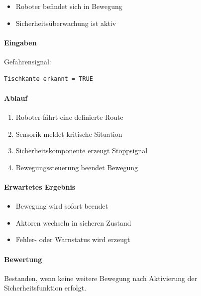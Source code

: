 \documentclass[
  a4paper,
  12pt,
  DIV=12,        %
  parskip=half,  %
  headings=small %
]{scrartcl}
\theoremstyle{definition}
\providecommand{\tightlist}{%
  \setlength{\itemsep}{0pt}\setlength{\parskip}{0pt}}
\theoremstyle{definition}
\begin{document}
\begin{itemize}
\tightlist
\item
  Roboter befindet sich in Bewegung
\item
  Sicherheitsüberwachung ist aktiv
\end{itemize}

\paragraph{Eingaben}\label{eingaben-12}

Gefahrensignal:

\begin{verbatim}
Tischkante erkannt = TRUE
\end{verbatim}

\paragraph{Ablauf}\label{ablauf-12}

\begin{enumerate}
\def\labelenumi{\arabic{enumi}.}
\tightlist
\item
  Roboter fährt eine definierte Route
\item
  Sensorik meldet kritische Situation
\item
  Sicherheitskomponente erzeugt Stoppsignal
\item
  Bewegungssteuerung beendet Bewegung
\end{enumerate}

\paragraph{Erwartetes Ergebnis}\label{erwartetes-ergebnis-12}

\begin{itemize}
\tightlist
\item
  Bewegung wird sofort beendet
\item
  Aktoren wechseln in sicheren Zustand
\item
  Fehler- oder Warnstatus wird erzeugt
\end{itemize}

\paragraph{Bewertung}\label{bewertung-12}

Bestanden, wenn keine weitere Bewegung nach Aktivierung der
Sicherheitsfunktion erfolgt.
\end{document}
